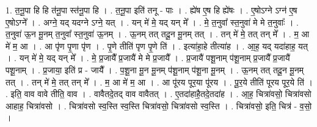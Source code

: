 \documentclass[17pt]{extarticle}
\begin{document}
1. त॒नू॒पा हि हि त॑नू॒पा स्त॑नू॒पा हि । . त॒नू॒पा इति॑ तनू - पाः । . ह्ये॑ष ए॒ष हि ह्ये॑षः । . ए॒षोऽग्ने ऽग्न॑ ए॒ष ए॒षोऽग्ने᳚ । . अग्ने॒ यद् यदग्ने ऽग्ने॒ यत् । . यन् मे॑ मे॒ यद् यन् मे᳚ । . मे॒ त॒नुवा᳚ स्त॒नुवा॑ मे मे त॒नुवाः᳚ । . त॒नुवा॑ ऊ॒न मू॒नम् त॒नुवा᳚ स्त॒नुवा॑ ऊ॒नम् । . ऊ॒नम् तत् तदू॒न मू॒नम् तत् । . तन् मे॑ मे॒ तत् तन् मे᳚ । . म॒ आ मे॑ म॒ आ । . आ पृ॑ण पृ॒णा पृ॑ण । . पृ॒णे तीति॑ पृण पृ॒णे ति॑ । . इत्या॑हा॒हे तीत्या॑ह । . आ॒ह॒ यद् यदा॑हाह॒ यत् । . यन् मे॑ मे॒ यद् यन् मे᳚ । . मे॒ प्र॒जायै᳚ प्र॒जायै॑ मे मे प्र॒जायै᳚ । . प्र॒जायै॑ पशू॒नाम् प॑शू॒नाम् प्र॒जायै᳚ प्र॒जायै॑ पशू॒नाम् । . प्र॒जाया॒ इति॑ प्र - जायै᳚ । . प॒शू॒ना मू॒न मू॒नम् प॑शू॒नाम् प॑शू॒ना मू॒नम् । . ऊ॒नम् तत् तदू॒न मू॒नम् तत् । . तन् मे॑ मे॒ तत् तन् मे᳚ । . म॒ आ मे॑ म॒ आ । . आ पू॑रय पूर॒या पू॑रय । . पू॒र॒ये तीति॑ पूरय पूर॒ये ति॑ । . इति॒ वाव वावे तीति॒ वाव । . वावैतदे॒तद् वाव वावैतत् । . ए॒तदा॑हाहै॒तदे॒तदा॑ह । . आ॒ह॒ चित्रा॑वसो॒ चित्रा॑वसो आहाह॒ चित्रा॑वसो । . चित्रा॑वसो स्व॒स्ति स्व॒स्ति चित्रा॑वसो॒ चित्रा॑वसो स्व॒स्ति । . चित्रा॑वसो॒ इति॒ चित्र॑ - व॒सो॒ । \newline
\end{document}
